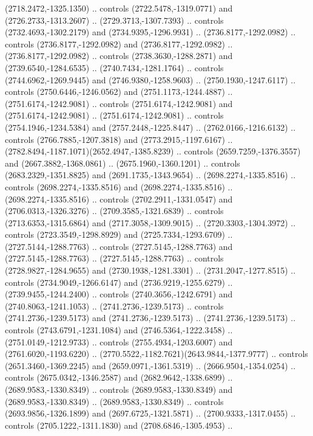 \begin{scope}[shift={(28.3138,-376.6591)}]
\begin{scope}[shift={(-2186.6262,1813.8454)}]
      (2718.2472,-1325.1350) .. controls (2722.5478,-1319.0771) and
      (2726.2733,-1313.2607) .. (2729.3713,-1307.7393) .. controls
      (2732.4693,-1302.2179) and (2734.9395,-1296.9931) .. (2736.8177,-1292.0982) ..
      controls (2736.8177,-1292.0982) and (2736.8177,-1292.0982) ..
      (2736.8177,-1292.0982) .. controls (2738.3630,-1288.2871) and
      (2739.6540,-1284.6535) .. (2740.7434,-1281.1764) .. controls
      (2744.6962,-1269.9445) and (2746.9380,-1258.9603) .. (2750.1930,-1247.6117) ..
      controls (2750.6446,-1246.0562) and (2751.1173,-1244.4887) ..
      (2751.6174,-1242.9081) .. controls (2751.6174,-1242.9081) and
      (2751.6174,-1242.9081) .. (2751.6174,-1242.9081) .. controls
      (2754.1946,-1234.5384) and (2757.2448,-1225.8447) .. (2762.0166,-1216.6132) ..
      controls (2766.7885,-1207.3818) and (2773.2915,-1197.6167) ..
      (2782.8494,-1187.1071)(2652.4947,-1385.8239) .. controls
      (2659.7259,-1376.3557) and (2667.3882,-1368.0861) .. (2675.1960,-1360.1201) ..
      controls (2683.2329,-1351.8825) and (2691.1735,-1343.9654) ..
      (2698.2274,-1335.8516) .. controls (2698.2274,-1335.8516) and
      (2698.2274,-1335.8516) .. (2698.2274,-1335.8516) .. controls
      (2702.2911,-1331.0547) and (2706.0313,-1326.3276) .. (2709.3585,-1321.6839) ..
      controls (2713.6353,-1315.6864) and (2717.3058,-1309.9015) ..
      (2720.3303,-1304.3972) .. controls (2723.3549,-1298.8929) and
      (2725.7334,-1293.6709) .. (2727.5144,-1288.7763) .. controls
      (2727.5145,-1288.7763) and (2727.5145,-1288.7763) .. (2727.5145,-1288.7763) ..
      controls (2728.9827,-1284.9655) and (2730.1938,-1281.3301) ..
      (2731.2047,-1277.8515) .. controls (2734.9049,-1266.6147) and
      (2736.9219,-1255.6279) .. (2739.9455,-1244.2400) .. controls
      (2740.3656,-1242.6791) and (2740.8063,-1241.1053) .. (2741.2736,-1239.5173) ..
      controls (2741.2736,-1239.5173) and (2741.2736,-1239.5173) ..
      (2741.2736,-1239.5173) .. controls (2743.6791,-1231.1084) and
      (2746.5364,-1222.3458) .. (2751.0149,-1212.9733) .. controls
      (2755.4934,-1203.6007) and (2761.6020,-1193.6220) ..
      (2770.5522,-1182.7621)(2643.9844,-1377.9777) .. controls
      (2651.3460,-1369.2245) and (2659.0971,-1361.5319) .. (2666.9504,-1354.0254) ..
      controls (2675.0342,-1346.2587) and (2682.9642,-1338.6899) ..
      (2689.9583,-1330.8349) .. controls (2689.9583,-1330.8349) and
      (2689.9583,-1330.8349) .. (2689.9583,-1330.8349) .. controls
      (2693.9856,-1326.1899) and (2697.6725,-1321.5871) .. (2700.9333,-1317.0455) ..
      controls (2705.1222,-1311.1830) and (2708.6846,-1305.4953) ..

\end{scope}
\end{scope}
